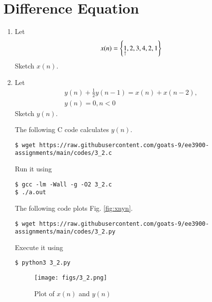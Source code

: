 \documentclass[journal,12pt,twocolumn]{IEEEtran}
\renewcommand\thesection{\arabic{section}}
\begin{document}
\section{Difference Equation}
\begin{enumerate}[label=\thesection.\arabic*,ref=\thesection.\theenumi]
\item Let
\begin{equation}
x(n) = \left\{\underset{\uparrow}{1},2,3,4,2,1\right\}
\end{equation}
Sketch $x(n)$.
\item Let
\begin{multline}
\label{eq:iir_filter}
y(n) + \frac{1}{2}y(n-1) = x(n) + x(n-2), 
\\
y(n) = 0, n < 0
\end{multline}
Sketch $y(n)$.

\solution The following C code calculates $y(n)$.
\begin{lstlisting}
$ wget https://raw.githubusercontent.com/goats-9/ee3900-assignments/main/codes/3_2.c
\end{lstlisting}
Run it using
\begin{lstlisting}
$ gcc -lm -Wall -g -O2 3_2.c
$ ./a.out
\end{lstlisting}
The following code plots Fig. \eqref{fig:xnyn}.
\begin{lstlisting}
$ wget https://raw.githubusercontent.com/goats-9/ee3900-assignments/main/codes/3_2.py
\end{lstlisting}
Execute it using
\begin{lstlisting}
$ python3 3_2.py
\end{lstlisting}

\begin{figure}[!ht]
	\centering
	\texttt{[image: figs/3\_2.png]}
	\caption{Plot of $x(n)$ and $y(n)$}
	\label{fig:xnyn}
\end{figure}
\end{enumerate}
\end{document}
